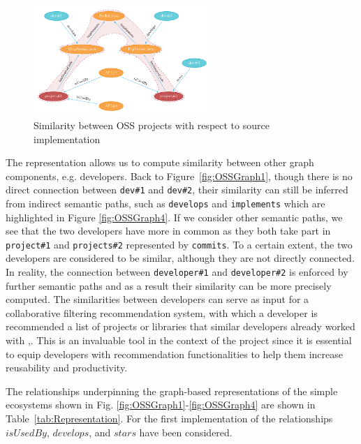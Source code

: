  
 \begin{figure}[h!]
 	\centering
 	\includegraphics[width=0.60\textwidth]{images/OSSGraph2.pdf}
 	\caption{Similarity between OSS projects with respect to source implementation}
 	\label{fig:OSSGraph2}
 \end{figure}
 
 
The representation allows us to compute similarity between other graph components, e.g. developers. Back to Figure~\ref{fig:OSSGraph1}, though there is no direct connection between \texttt{dev\#1} and \texttt{dev\#2}, their similarity can still be inferred from indirect semantic paths, such as \texttt{develops} and \texttt{implements} which are highlighted in Figure \ref{fig:OSSGraph4}.
If we consider other semantic paths, we see that the two developers have more in common as they both take part in \texttt{project\#1} and \texttt{projects\#2} represented by \texttt{commits}. To a certain extent, the two developers are considered to be similar, although they are not directly connected. In reality, the connection between \texttt{developer\#1} and \texttt{developer\#2} is enforced by further semantic paths and as a result their similarity can be more precisely computed. The similarities between developers can serve as input for a collaborative filtering recommendation system, with which a developer is recommended a list of projects or libraries that similar developers already worked with \cite{Pazzani2007},\cite{Schafer:2007:CFR:1768197.1768208}. This is an invaluable tool in the context of the \projectName project since it is essential to equip developers with recommendation functionalities to help them increase reusability and productivity.
 
 

 
 
The relationships underpinning the graph-based representations of the simple ecosystems shown in Fig. \ref{fig:OSSGraph1}-\ref{fig:OSSGraph4} are shown in Table~\ref{tab:Representation}. For the first implementation of \CrossSim the relationships $isUsedBy$, $develops$, and $stars$ have been considered. 
 
